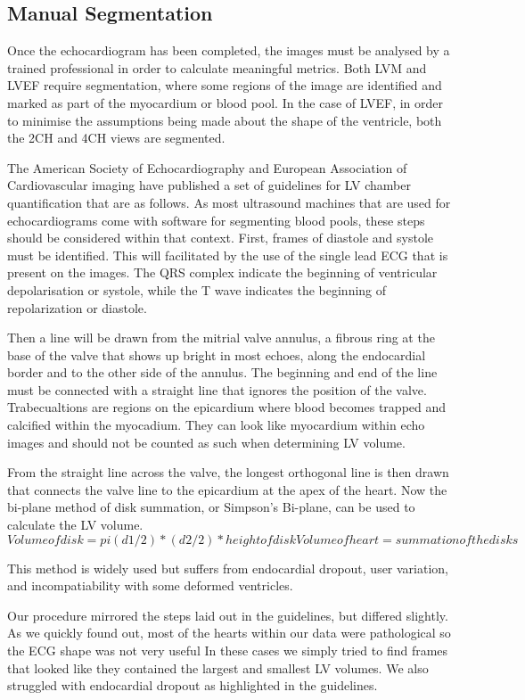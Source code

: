 \documentclass[12pt]{article}
\begin{document}
\subsection{Manual Segmentation}
Once the echocardiogram has been completed, the images must be analysed by a trained professional in order to calculate meaningful metrics.
Both LVM and LVEF require segmentation, where some regions of the image are identified and marked as part of the myocardium or blood pool.
In the case of LVEF, in order to minimise the assumptions being made about the shape of the ventricle, both the 2CH and 4CH views are segmented.
\par
The American Society of Echocardiography and European Association of Cardiovascular imaging have published a set of guidelines for LV chamber quantification that are as follows.
As most ultrasound machines that are used for echocardiograms come with software for segmenting blood pools, these steps should be considered within that context.
First, frames of diastole and systole must be identified.
This will facilitated by the use of the single lead ECG that is present on the images.
The QRS complex indicate the beginning of ventricular depolarisation or systole, while the T wave indicates the beginning of repolarization or diastole.
\par
Then a line will be drawn from the mitrial valve annulus, a fibrous ring at the base of the valve that shows up bright in most echoes, along the endocardial border and to the other side of the annulus.
The beginning and end of the line must be connected with a straight line that ignores the position of the valve. 
Trabecualtions are regions on the epicardium where blood becomes trapped and calcified within the myocadium.\cite{jacc_ef_p_and_c}
They can look like myocardium within echo images and should not be counted as such when determining LV volume. 
\par
From the straight line across the valve, the longest orthogonal line is then drawn that connects the valve line to the epicardium at the apex of the heart.
Now the bi-plane method of disk summation, or Simpson's Bi-plane, can be used to calculate the LV volume.
\begin{equation}
	Volume of disk = pi(d1/2)*(d2/2)*height of disk
	Volume of heart = summation of the disks
\end{equation}

This method is widely used but suffers from endocardial dropout, user variation, and incompatiability with some deformed ventricles.\cite{ase_quant_update}
\par
Our procedure  mirrored the steps laid out in the guidelines, but differed slightly.
As we quickly found out, most of the hearts within our data were pathological so the ECG shape was not very useful
In these cases we simply tried to find frames that looked like they contained the largest and smallest LV volumes.
We also struggled with endocardial dropout as highlighted in the guidelines.
\end{document}
